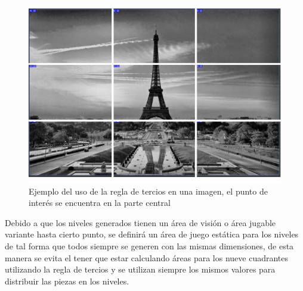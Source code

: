 \begin{figure}
  \centering
  \includegraphics[width=1.0\textwidth]{img/ruleofthirds_example.png}
  \caption{Ejemplo del uso de la regla de tercios en una imagen, el punto de interés se encuentra en la parte central}
  \label{figure:ruleofthirdsexample}
\end{figure}

Debido a que los niveles generados tienen un área de visión o área jugable
variante hasta cierto punto, se definirá un área de juego estática para los
niveles de tal forma que todos siempre se generen con las mismas dimensiones, de
esta manera se evita el tener que estar calculando áreas para los nueve
cuadrantes utilizando la regla de tercios y se utilizan siempre los mismos
valores para distribuir las piezas en los niveles.

